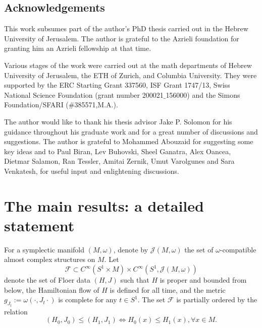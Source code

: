 \documentclass[11pt]{amsart}
\theoremstyle{definition}
\theoremstyle{remark}
\begin{document}
\subsection{Acknowledgements}
This work subsumes part of the author's PhD thesis carried out in the Hebrew University of Jerusalem.  The author is grateful to the Azrieli foundation for granting him an Azrieli fellowship at that time.

Various stages of the work were carried out at the math departments of Hebrew University of Jerusalem, the ETH of Zurich, and Columbia University. They were supported by the ERC Starting Grant 337560, ISF Grant 1747/13, Swiss National
Science Foundation (grant number 200021$\_$156000) and the Simons Foundation/SFARI ($\#$385571,M.A.).

The author would like to thank his thesis advisor Jake P. Solomon for his guidance throughout his graduate work and for a great number of discussions and suggestions. The author is grateful to Mohammed Abouzaid for suggesting some key ideas and to Paul Biran, Lev Buhovski, Sheel Ganatra, Alex Oancea, Dietmar Salamon, Ran Tessler, Amitai Zernik, Umut Varolgunes and Sara Venkatesh, for useful input and enlightening discussions.
\section{The main results: a detailed statement}\label{SecIntro2}
For a symplectic manifold $(M,\omega)$, denote by $\mathcal{J}(M,\omega)$ the set of $\omega$-compatible almost complex structures on $M$. Let
\[
    \mathcal{F} \subset C^{\infty}(S^1\times M)\times C^{\infty}(S^1,\mathcal{J}(M,\omega))
\]
denote the set of Floer data $(H,J)$ such that $H$ is proper and bounded from below, the  Hamiltonian flow of $H$ is defined for all time, and the metric $g_{J_t}:=\omega(\cdot,J_t\cdot)$ is complete for any $t\in S^1$. The set $\mathcal{F}$ is partially ordered by the relation
\[
(H_0,J_0)\leq (H_1, J_1)\iff H_0(x)\leq H_1(x),\forall x\in M.
\]
\end{document}
